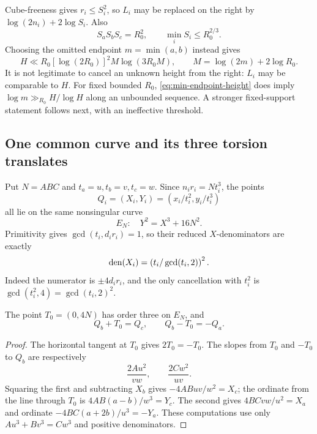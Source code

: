 Cube-freeness gives $r_i\le S_i^2$, so $L_i$ may be replaced on the
right by $\log(2n_i)+2\log S_i$. Also
\begin{equation}\label{eq:residual-support-product}
 S_aS_bS_c=R_0^2,\qquad \min_i S_i\le R_0^{2/3}.
\end{equation}
Choosing the omitted endpoint $m=\min(a,b)$ instead gives
\begin{equation}\label{eq:min-endpoint-height}
 H\ll R_0[\log(2R_0)]^2 M\log(3R_0M),
 \qquad M=\log(2m)+2\log R_0.
\end{equation}
It is not legitimate to cancel an unknown height from the right:
$L_i$ may be comparable to $H$. For fixed bounded $R_0$,
\eqref{eq:min-endpoint-height} does imply
$\log m\gg_{R_0}H/\log H$ along an unbounded sequence. A stronger
fixed-support statement follows next, with an ineffective threshold.

\subsection{One common curve and its three torsion translates}

Put $N=ABC$ and $t_a=u,t_b=v,t_c=w$. Since $n_i r_i=Nt_i^3$,
the points
\[
 Q_i=(X_i,Y_i)=(x_i/t_i^2,y_i/t_i^3)
\]
all lie on the same nonsingular curve
\begin{equation}\label{eq:common-mordell-curve}
 E_N:\quad Y^2=X^3+16N^2.
\end{equation}
Primitivity gives $\gcd(t_i,d_i r_i)=1$, so their reduced
$X$-denominators are exactly
\begin{equation}\label{eq:common-point-denominator}
 \operatorname{den}(X_i)=\left(t_i/\gcd(t_i,2)\right)^2.
\end{equation}
Indeed the numerator is $\pm4d_i r_i$, and the only cancellation
with $t_i^2$ is $\gcd(t_i^2,4)=\gcd(t_i,2)^2$.

\begin{proposition}\label{prop:torsion-orbit}
The point $T_0=(0,4N)$ has order three on $E_N$, and
\[
 Q_b+T_0=Q_c,\qquad Q_b-T_0=-Q_a.
\]
\end{proposition}
\begin{proof}
The horizontal tangent at $T_0$ gives $2T_0=-T_0$.
The slopes from $T_0$ and $-T_0$ to $Q_b$ are respectively
\[
 \frac{2Au^2}{vw},\qquad \frac{2Cw^2}{uv}.
\]
Squaring the first and subtracting $X_b$ gives
$-4ABuv/w^2=X_c$; the ordinate from the line through $T_0$ is
$4AB(a-b)/w^3=Y_c$. The second gives
$4BCvw/u^2=X_a$ and ordinate $-4BC(a+2b)/u^3=-Y_a$.
These computations use only $Au^3+Bv^3=Cw^3$ and positive denominators.
\end{proof}

